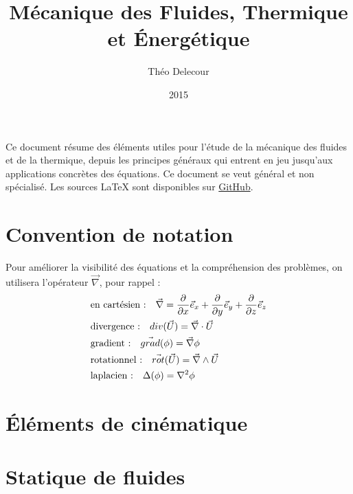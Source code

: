 \documentclass[10pt,a4paper,twocolumn,fleqn]{article}
\title{Mécanique des Fluides, Thermique et Énergétique}
\author{Théo Delecour}
\date{2015}
\begin{document}
\makeatletter

\begin{center}
    \LARGE \@title
    
    \Large \@author
\end{center}

\makeatother

Ce document résume des éléments utiles pour l'étude de la mécanique des fluides et de la thermique, depuis les principes généraux qui entrent en jeu jusqu'aux applications concrètes des équations. Ce document se veut général et non spécialisé. Les sources \LaTeX{} sont disponibles sur \href{https://github.com/theolamayo/flui-ther-fr}{GitHub}.



\section*{Convention de notation}
Pour améliorer la visibilité des équations et la compréhension des problèmes, on utilisera l'opérateur $\vec{\nabla}$, pour rappel :
%
\begin{align}
    \notag &\text{en cartésien :} \quad \vec{\nabla} = \frac{\partial}{\partial x} \vec{e}_x + \frac{\partial}{\partial y} \vec{e}_y + \frac{\partial}{\partial z} \vec{e}_z \\
    \notag &\text{divergence :} \quad div (\vec{U}) = \vec{\nabla} \cdot \vec{U} \\
    \notag &\text{gradient :} \quad \vec{grad} (\phi) = \vec{\nabla} \phi \\
    \notag &\text{rotationnel :} \quad \vec{rot} (\vec{U}) = \vec{\nabla} \wedge \vec{U} \\
    \notag &\text{laplacien :} \quad \Delta (\phi) = \nabla^2 \phi
\end{align}


\section{Éléments de cinématique}


\section{Statique de fluides}\label{sec:statique} %

\end{document}
